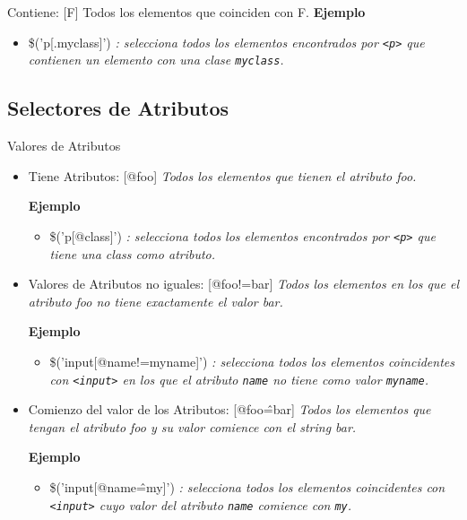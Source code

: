 \begin{frame}[fragile]{Contiene: [F]} %
Todos los elementos que coinciden con F.
\textbf{Ejemplo}
\begin{itemize}
    \item \$('p[.myclass]') \textit{: selecciona todos los elementos
    encontrados por \texttt{<p>} que contienen un elemento con una clase
    \texttt{myclass}.}
\end{itemize}
\end{frame}

\subsection{Selectores de Atributos} %

\begin{frame}[fragile]{Valores de Atributos} %
\begin{itemize}
\item Tiene Atributos: [@foo] \textit{Todos los elementos que tienen el
atributo foo.}
    
    \textbf{Ejemplo}
    \begin{itemize}
        \item \$('p[@class]') \textit{: selecciona todos los elementos encontrados
    por \texttt{<p>} que tiene una class como atributo.}
    \end{itemize}
\item Valores de Atributos no iguales: [@foo!=bar] \textit{Todos los elementos en los que el atributo foo no tiene exactamente el valor
bar.}
    
    \textbf{Ejemplo}
    \begin{itemize}
        \item \$('input[@name!=myname]') \textit{: selecciona todos los elementos
    coincidentes con \texttt{<input>} en los que el atributo \texttt{name} no
    tiene como valor \texttt{myname}.}
    \end{itemize}

\item Comienzo del valor de los Atributos: [@foo\^=bar] \textit{Todos los
elementos que tengan el atributo foo y su valor comience con el string bar.}
    
    \textbf{Ejemplo}
    \begin{itemize}
        \item \$('input[@name\^=my]') \textit{: selecciona todos los elementos
    coincidentes con \texttt{<input>} cuyo valor del atributo \texttt{name}
    comience con \texttt{my}.}
    \end{itemize}
\end{itemize}
\end{frame}

